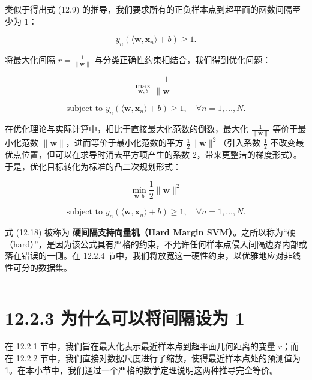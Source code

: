 类似于得出式 (12.9) 的推导，我们要求所有的正负样本点到超平面的函数间隔至少为 $ 1 $：

\begin{equation}
y_n (\langle \boldsymbol{w}, \boldsymbol{x}_n \rangle + b) \geqslant 1 .
\tag{12.15}
\end{equation}

将最大化间隔 $ r = \frac{1}{\|\boldsymbol{w}\|} $ 与分类正确性约束相结合，我们得到优化问题：

\begin{equation}
\max_{\boldsymbol{w}, b} \frac{1}{\|\boldsymbol{w}\|}
\tag{12.16}
\end{equation}

\begin{equation}
\text{subject to } y_n (\langle \boldsymbol{w}, \boldsymbol{x}_n \rangle + b) \geqslant 1, \quad \forall n = 1, \ldots, N .
\tag{12.17}
\end{equation}

在优化理论与实际计算中，相比于直接最大化范数的倒数，最大化 $ \frac{1}{\|\boldsymbol{w}\|} $ 等价于最小化范数 $ \|\boldsymbol{w}\| $，进而等价于最小化范数的平方 $ \frac{1}{2}\|\boldsymbol{w}\|^2 $（引入系数 $ \frac{1}{2} $ 不改变最优点位置，但可以在求导时消去平方项产生的系数 2，带来更整洁的梯度形式）。于是，优化目标转化为标准的凸二次规划形式：

\begin{equation}
\min_{\boldsymbol{w}, b} \frac{1}{2} \|\boldsymbol{w}\|^2
\tag{12.18}
\end{equation}

\begin{equation}
\text{subject to } y_n (\langle \boldsymbol{w}, \boldsymbol{x}_n \rangle + b) \geqslant 1, \quad \forall n = 1, \ldots, N .
\tag{12.19}
\end{equation}

式 (12.18) 被称为 \textbf{硬间隔支持向量机（Hard Margin SVM）}。之所以称为“硬（hard）”，是因为该公式具有严格的约束，不允许任何样本点侵入间隔边界内部或落在错误的一侧。在 12.2.4 节中，我们将放宽这一硬性约束，以优雅地应对非线性可分的数据集。

\medskip\hrule\medskip

\section*{12.2.3 为什么可以将间隔设为 1}

在 12.2.1 节中，我们旨在最大化表示最近样本点到超平面几何距离的变量 $ r $；而在 12.2.2 节中，我们直接对数据尺度进行了缩放，使得最近样本点处的预测值为 1。在本小节中，我们通过一个严格的数学定理说明这两种推导完全等价。

